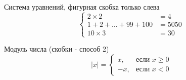 \documentclass[a4paper,12pt]{article}                       %
\begin{document}
Система уравнений, фигурная скобка только слева
\[\left\{
    \begin{aligned}
        2 \times 2               & = 4    \\
        1 + 2 + \dots + 99 + 100 & = 5050 \\
        10 \times 3              & = 30
    \end{aligned}\right. %
\]

Модуль числа (скобки - способ 2)
\[
    |x| = \begin{cases}
        x,  & \text{если } x \ge 0 \\
        -x, & \text{если } x < 0
    \end{cases}
\]
\end{document}
